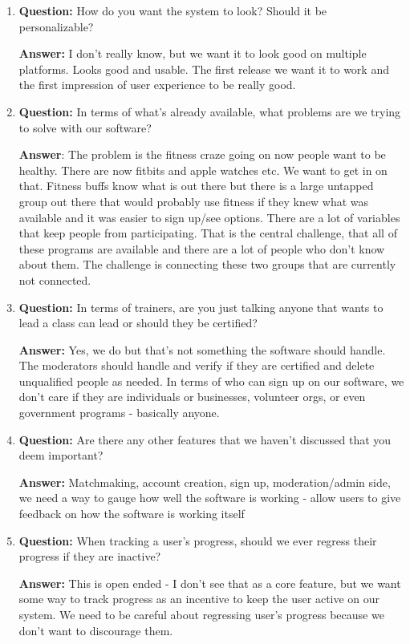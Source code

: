 \documentclass[12pt]{article}
\begin{document}
\begin{enumerate}
\item \textbf{Question:}  How do you want the system to look? Should it be personalizable?

\textbf{Answer:}  I don’t really know, but we want it to look good on multiple platforms.  Looks good and usable.  The first release we want it to work and the first impression of user experience to be really good.

\item \textbf{Question:}  In terms of what’s already available, what problems are we trying to solve with our software?

\textbf{Answer}:  The problem is the fitness craze going on now people want to be healthy. There are now fitbits and apple watches etc. We want to get in on that.  Fitness buffs know what is out there but there is a large untapped group out there that would probably use fitness if they knew what was available and it was easier to sign up/see options.  There are a lot of variables that keep people from participating.  That is the central challenge, that all of these programs are available and there are a lot of people who don’t know about them.  The challenge is connecting these two groups that are currently not connected.

\item \textbf{Question:} In terms of trainers, are you just talking anyone that wants to lead a class can lead or should they be certified? 

\textbf{Answer:} Yes, we do but that’s not something the software should handle. The moderators should handle and verify if they are certified and delete unqualified people as needed. In terms of who can sign up on our software, we don’t care if they are individuals or businesses, volunteer orgs, or even government programs - basically anyone.

\item \textbf{Question:} Are there any other features that we haven’t discussed that you deem important?

\textbf{Answer:} Matchmaking, account creation, sign up, moderation/admin side, we need a way to gauge how well the software is working - allow users to give feedback on how the software is working itself

\item \textbf{Question:} When tracking a user’s progress, should we ever regress their progress if they are inactive? 

\textbf{Answer:} This is open ended - I don’t see that as a core feature, but we want some way to track progress as an incentive to keep the user active on our system. We need to be careful about regressing user’s progress because we don’t want to discourage them.


\end{enumerate}
\end{document}

